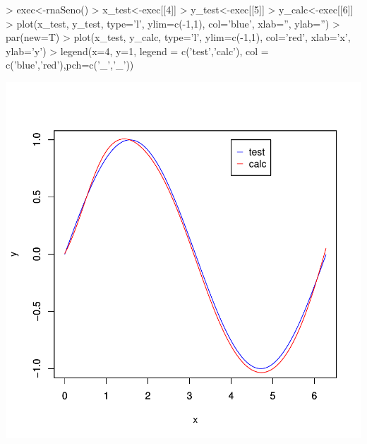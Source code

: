 \documentclass{article}
\begin{document}
\begin{Schunk}
\begin{Sinput}
>   exec<-rnaSeno() 
>   x_test<-exec[[4]]
>   y_test<-exec[[5]]
>   y_calc<-exec[[6]]
>   plot(x_test, y_test, type='l', ylim=c(-1,1), col='blue', xlab='', ylab='')
>   par(new=T)
>   plot(x_test, y_calc, type='l', ylim=c(-1,1), col='red', xlab='x', ylab='y')
>   legend(x=4, y=1, legend = c('test','calc'), col = c('blue','red'),pch=c('_','_'))
\end{Sinput}
\end{Schunk}
\includegraphics{backpropagation-003}
\end{document}
